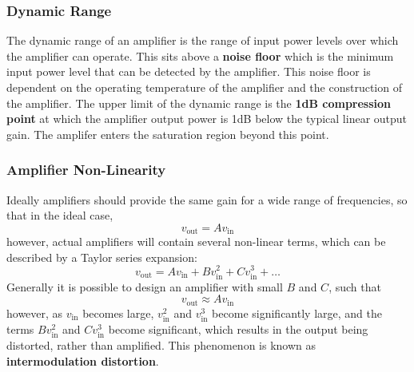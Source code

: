 \documentclass{article}
\begin{document}
\subsubsection{Dynamic Range}
The dynamic range of an amplifier is the range of input power levels
over which the amplifier can operate. This sits above a \textbf{noise
floor} which is the minimum input power level that can be detected by
the amplifier. This noise floor is dependent on the operating
temperature of the amplifier and the construction of the amplifier. The
upper limit of the dynamic range is the \textbf{1dB compression point}
at which the amplifier output power is 1dB below the typical linear
output gain. The amplifer enters the saturation region beyond this
point.
\subsubsection{Amplifier Non-Linearity}
Ideally amplifiers should provide the same gain for a wide range of
frequencies, so that in the ideal case,
\begin{equation*}
    v_{\mathrm{out}} = A v_{\mathrm{in}}
\end{equation*}
however, actual amplifiers will contain several non-linear terms, which
can be described by a Taylor series expansion:
\begin{equation*}
    v_{\mathrm{out}} = A v_{\mathrm{in}} + B v_{\mathrm{in}}^2 + C v_{\mathrm{in}}^3 + \ldots
\end{equation*}
Generally it is possible to design an amplifier with small \(B\) and
\(C\), such that
\begin{equation*}
    v_{\mathrm{out}} \approx A v_{\mathrm{in}}
\end{equation*}
however, as \(v_{\mathrm{in}}\) becomes large, \(v_{\mathrm{in}}^2\) and \(v_{\mathrm{in}}^3\) become
significantly large, and the terms \(B v_{\mathrm{in}}^2\) and \(C v_{\mathrm{in}}^3\) become
significant, which results in the output being distorted, rather than
amplified. This phenomenon is known as \textbf{intermodulation distortion}.
\end{document}
